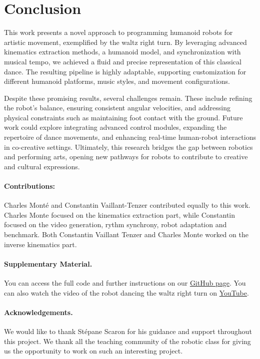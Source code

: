 \documentclass{amsart}
\theoremstyle{definition}
\theoremstyle{plain}
\begin{document}
  \section{Conclusion}

  This work presents a novel approach to programming humanoid robots for artistic movement, exemplified by the waltz right turn. 
  By leveraging advanced kinematics extraction methods, a humanoid model, 
  and synchronization with musical tempo, we achieved a fluid and precise representation of this classical dance. 
  The resulting pipeline is highly adaptable, supporting customization for different humanoid platforms, music styles, and movement configurations.

  Despite these promising results, several challenges remain. 
  These include refining the robot's balance, ensuring consistent angular velocities, and addressing physical constraints such as maintaining foot contact with the ground. 
  Future work could explore integrating advanced control modules, expanding the repertoire of dance movements, and enhancing real-time human-robot interactions in co-creative settings. 
  Ultimately, this research bridges the gap between robotics and performing arts, opening new pathways for robots to contribute to creative and cultural expressions.
  

\paragraph{Contributions:} Charles Monté and Constantin Vaillant-Tenzer contributed equally to this work. Charles Monte focused on the kinematics extraction part, while Constantin focused on the video generation, rythm synchrony, robot adaptation and benchmark. 
Both Constantin Vaillant Tenzer and Charles Monte worked on the inverse kinematics part.

\paragraph{Supplementary Material.} You can access the full code and further instructions on our \href{https://github.com/cvt8/waltz_robot}{GitHub page}.
You can also watch the video of the robot dancing the waltz right turn on \href{https://www.youtube.com/watch?v=1MIFP3BURI0}{YouTube}.

\paragraph{Acknowledgements.} We would like to thank Stépane Scaron for his guidance and support throughout this project. 
We thank all the teaching community of the robotic class for giving us the opportunity to work on such an interesting project.

\printbibliography[]
\end{document}
